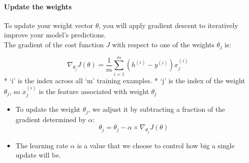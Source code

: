 \documentclass[11pt]{article}
\providecommand{\tightlist}{%
      \setlength{\itemsep}{0pt}\setlength{\parskip}{0pt}}
\begin{document}
    \hypertarget{update-the-weights}{%
\paragraph{Update the weights}\label{update-the-weights}}

To update your weight vector \(\theta\), you will apply gradient descent
to iteratively improve your model's predictions.\\
The gradient of the cost function \(J\) with respect to one of the
weights \(\theta_j\) is:

\[\nabla_{\theta_j}J(\theta) = \frac{1}{m} \sum_{i=1}^m(h^{(i)}-y^{(i)})x^{(i)}_j \tag{5}\]
* `i' is the index across all `m' training examples. * `j' is the index
of the weight \(\theta_j\), so \(x^{(i)}_j\) is the feature associated
with weight \(\theta_j\)

\begin{itemize}
\tightlist
\item
  To update the weight \(\theta_j\), we adjust it by subtracting a
  fraction of the gradient determined by \(\alpha\):
  \[\theta_j = \theta_j - \alpha \times \nabla_{\theta_j}J(\theta) \]
\item
  The learning rate \(\alpha\) is a value that we choose to control how
  big a single update will be.
\end{itemize}
\end{document}

